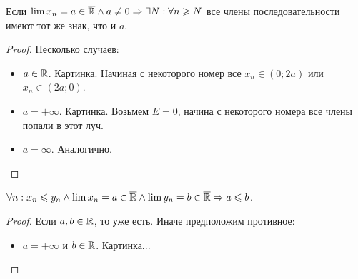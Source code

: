 \begin{theorem}
    Если $\lim x_n = a \in \overline{\mathbb{R}} \land a \neq 0 \Rightarrow \exists N: \forall n \geqslant N$ все члены последовательности имеют тот же знак, что и $a$.
\end{theorem}
\begin{proof}
    Несколько случаев:
     \begin{itemize}
         \item $a \in \mathbb{R}$. Картинка. Начиная с некоторого номер все  $x_n \in (0; 2a)$ или  $x_n \in (2a; 0)$.
         \item  $a = +\infty$. Картинка. Возьмем  $E=0$, начина с некоторого номера все члены попали в этот луч.
         \item  $a = \infty$. Аналогично.
    \end{itemize}
\end{proof}
\begin{theorem}
    $\forall n: x_n \leqslant y_n \land \lim x_n = a \in \overline{\mathbb{R}} \land \lim y_n = b \in \overline{\mathbb{R}} \Rightarrow a \leqslant b$.
\end{theorem}
\begin{proof}
    Если $a, b \in \mathbb{R}$, то уже есть. Иначе предположим противное:
     \begin{itemize}
         \item $a = +\infty$ и  $b \in \mathbb{R}$. Картинка...
    \end{itemize}
\end{proof}

